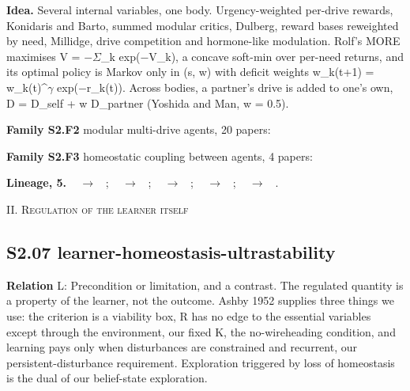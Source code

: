 \documentclass[10pt]{article}
\newcommand{\memb}[1]{\par\smallskip\textbf{#1}\quad}
\begin{document}
\textbf{Idea.} Several internal variables, one body. Urgency-weighted per-drive rewards, Konidaris and Barto, summed modular critics, Dulberg, reward bases reweighted by need, Millidge, drive competition and hormone-like modulation. Rolf's MORE maximises V = \ensuremath{-}\ensuremath{\Sigma}\_k exp(\ensuremath{-}V\_k), a concave soft-min over per-need returns, and its optimal policy is Markov only in (s, w) with deficit weights w\_k(t+1) = w\_k(t)\^{}\ensuremath{\gamma} exp(\ensuremath{-}r\_k(t)). Across bodies, a partner's drive is added to one's own, D = D\_self + w D\_partner (Yoshida and Man, w = 0.5).

\memb{Family S2.F2} modular multi-drive agents, 20 papers: {\footnotesize \citetext{\citealp{Konidaris-adaptive06}; \citealp{Rolf-need20}; \citealp{GuerreroRosado-drive22}\dag; \citealp{Dulberg-having23}; \citealp{Millidge-reward24}; \citealp{Tyrrell-use93}; \citealp{Spier-possibly97}; \citealp{AvilaGarcia-using04}; \citealp{Moioli-multiple09}; \citealp{Kompella-anti14}; \citealp{Ravichandran-modelling18}\dag; \citealp{Strannegard-learning18}; \citealp{Andersson-exploration19}; \citealp{Strannegard-combining20}; \citealp{Dulberg-modularity22}; \citealp{Berto-learning23}; \citealp{MarotoGomez-biologically23}; \citealp{Rossi-drives24}; \citealp{GuerreroRosado-motivational25}; \citealp{Rossi-dual25}\dag}}

\memb{Family S2.F3} homeostatic coupling between agents, 4 papers: {\footnotesize \citetext{\citealp{Yoshida-empathic24}; \citealp{Yoshida-homeostatic25}; \citealp{Khan-effects19}; \citealp{ChristovMoore-preventing23}}}

\memb{Lineage, 5.} {\footnotesize \citeauthor{Hull-principles43}~\citeyear{Hull-principles43} $\to$ \citeauthor{Konidaris-adaptive06}~\citeyear{Konidaris-adaptive06}; \citeauthor{Konidaris-adaptive06}~\citeyear{Konidaris-adaptive06} $\to$ \citeauthor{Rolf-need20}~\citeyear{Rolf-need20}; \citeauthor{Keramati-reinforcement11}~\citeyear{Keramati-reinforcement11} $\to$ \citeauthor{Yoshida-homeostatic25}~\citeyear{Yoshida-homeostatic25}; \citeauthor{Keramati-homeostatic14}~\citeyear{Keramati-homeostatic14} $\to$ \citeauthor{Yoshida-empathic24}~\citeyear{Yoshida-empathic24}; \citeauthor{Yoshida-empathic24}~\citeyear{Yoshida-empathic24} $\to$ \citeauthor{Yoshida-homeostatic25}~\citeyear{Yoshida-homeostatic25}.}

\medskip\textsc{II. Regulation of the learner itself}

\subsection{S2.07 learner-homeostasis-ultrastability}\label{node:S2-S2-07-learner-homeostasis-ultrastability}
\textbf{Relation} \textsf{L}: Precondition or limitation, and a contrast. The regulated quantity is a property of the learner, not the outcome. Ashby 1952 supplies three things we use: the criterion is a viability box, R has no edge to the essential variables except through the environment, our fixed K, the no-wireheading condition, and learning pays only when disturbances are constrained and recurrent, our persistent-disturbance requirement. Exploration triggered by loss of homeostasis is the dual of our belief-state exploration.
\end{document}
